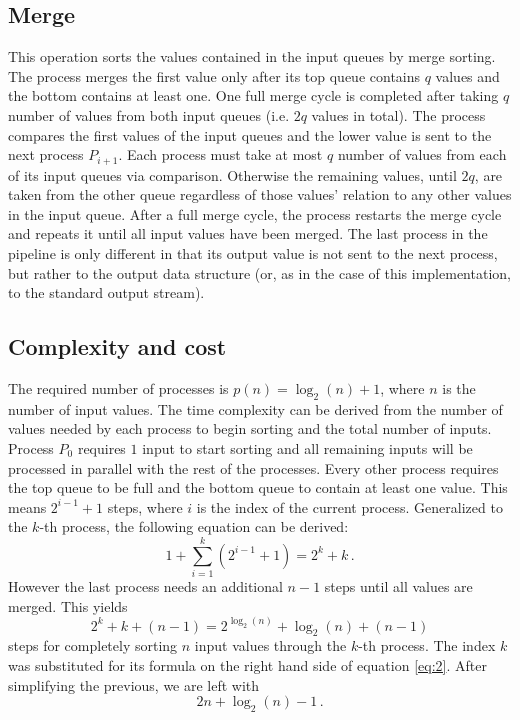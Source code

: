 \documentclass[pdftex, 11pt, a4paper, titlepage]{article}
\begin{document}
        \subsection*{Merge}
        This operation sorts the values contained in the input queues by merge sorting. The process merges the first value
        only after its top queue contains $q$ values and the bottom contains at least one. One full merge cycle is completed
        after taking $q$ number of values from both input queues (i.e. $2q$ values in total). The process compares the first
        values of the input queues and the lower value is sent to the next process $P_{i+1}$. Each process must take
        at most $q$ number of values from each of its input queues via comparison. Otherwise the remaining values, until $2q$,
        are taken from the other queue regardless of those values' relation to any other values in the input queue.
        After a full merge cycle, the process restarts the merge cycle and repeats it until all input values have been merged.
        The last process in the pipeline is only different in that its output value is not sent to the next process, but rather
        to the output data structure (or, as in the case of this implementation, to the standard output stream).

        \subsection{Complexity and cost}
        The required number of processes is $p(n) = \log_{2}(n)+1$, where $n$ is the number of input values. The time complexity
        can be derived from the number of values needed by each process to begin sorting and the total number of inputs.
        Process $P_0$ requires $1$ input to start sorting and all remaining inputs will be processed in parallel with the rest
        of the processes. Every other process requires the top queue to be full and the bottom queue to contain at least one value.
        This means $2^{i-1} + 1$ steps, where $i$ is the index of the current process. Generalized to the $k$-th process, the following
        equation can be derived:
        \begin{equation}\label{eq:1}
            1 + \sum_{i=1}^{k}(2^{i-1}+1) = 2^{k} + k\,.
        \end{equation}
        However the last process needs an additional $n-1$ steps until all values are merged. This yields
        \begin{equation}\label{eq:2}
            2^{k} + k + (n-1) = 2^{\log_{2}(n)} + \log_{2}(n) + (n-1)
        \end{equation}
        steps for completely sorting $n$ input values through the $k$-th process. The index $k$ was substituted for its formula
        on the right hand side of equation \ref{eq:2}. After simplifying the previous, we are left with
        \begin{equation}\label{eq:3}
            2n + \log_{2}(n) - 1\,.
        \end{equation}
\end{document}
